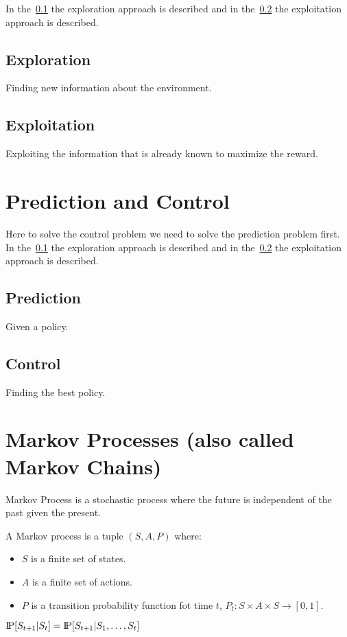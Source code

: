 \begin{itemize}
In the~\ref{subsec:exploration} the exploration approach is described and
in the~\ref{subsec:exploitation} the exploitation approach is described.

\subsection{Exploration}\label{subsec:exploration}
Finding new information about the environment.

\subsection{Exploitation}\label{subsec:exploitation}
Exploiting the information that is already known to maximize the reward.


\section{Prediction and Control}\label{sec:prediction-vs.-control}
Here to solve the control problem we need to solve the prediction problem first.
In the~\ref{subsec:exploration} the exploration approach is described and
in the~\ref{subsec:exploitation} the exploitation approach is described.

\subsection{Prediction}\label{subsec:prediction}
Given a policy.

\subsection{Control}\label{subsec:control}
Finding the best policy.


\section{Markov Processes (also called Markov Chains)}\label{sec:markov-processes}
Markov Process is a stochastic process where the future is independent of the past given the present.

\begin{definition}
    A Markov process is a tuple $(S,A,P)$ where:
    \begin{itemize}
        \item $S$ is a finite set of states.
        \item $A$ is a finite set of actions.
        \item $P$ is a transition probability function fot time $t$, $P_t:S\times A\times S\to[0,1]$.
    \end{itemize}
\end{definition}
$\text{I\kern-0.15em P}[S_{t+1}|S_t] = \text{I\kern-0.15em P}[S_{t+1}|S_1,\ldots,S_t]$



\end{itemize}
